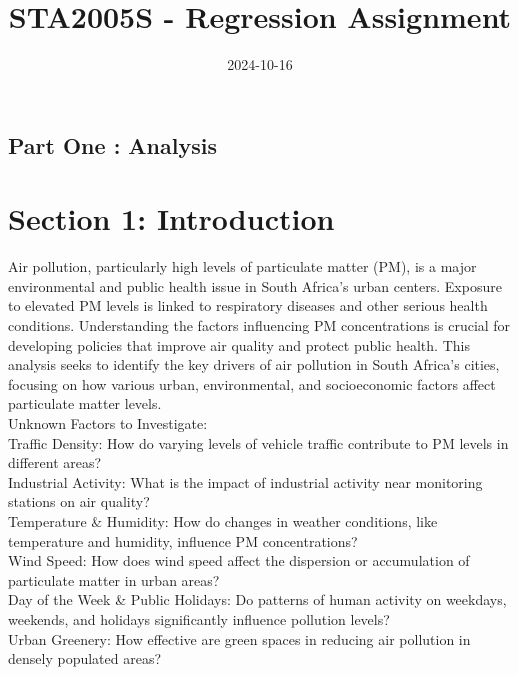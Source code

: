\documentclass[12pt,halfline,a4paper,]{ouparticle}
\begin{document}
\title{STA2005S - Regression Assignment}

\author{%
%
%
%
%
%
%
%
%
%
\and
{}
%
%
%
%
%
%
}

\abstract{}

\date{2024-10-16}

\keywords{}

\maketitle



\newpage

\subsection{Part One : Analysis}\label{part-one-analysis}

\section{Section 1: Introduction}\label{section-1-introduction}

Air pollution, particularly high levels of particulate matter (PM), is a
major environmental and public health issue in South Africa's urban
centers. Exposure to elevated PM levels is linked to respiratory
diseases and other serious health conditions. Understanding the factors
influencing PM concentrations is crucial for developing policies that
improve air quality and protect public health. This analysis seeks to
identify the key drivers of air pollution in South Africa's cities,
focusing on how various urban, environmental, and socioeconomic factors
affect particulate matter levels.\\
Unknown Factors to Investigate:\\
Traffic Density: How do varying levels of vehicle traffic contribute to
PM levels in different areas?\\
Industrial Activity: What is the impact of industrial activity near
monitoring stations on air quality?\\
Temperature \& Humidity: How do changes in weather conditions, like
temperature and humidity, influence PM concentrations?\\
Wind Speed: How does wind speed affect the dispersion or accumulation of
particulate matter in urban areas?\\
Day of the Week \& Public Holidays: Do patterns of human activity on
weekdays, weekends, and holidays significantly influence pollution
levels?\\
Urban Greenery: How effective are green spaces in reducing air pollution
in densely populated areas?
\end{document}
